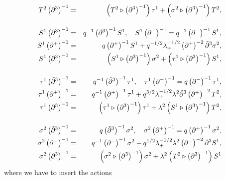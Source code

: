 \documentclass[a4paper,11pt,oneside]{article}
\begin{document}
\begin{eqnarray}
T^{2}\left( \partial ^{3}\right) ^{-1} &=&\left( T^{2}\triangleright \left(
\partial ^{3}\right) ^{-1}\right) \tau ^{1}+\left( \sigma ^{2}\triangleright
\left( \partial ^{3}\right) ^{-1}\right) T^{2},  \nonumber \\[0.16in]
S^{1}\left( \tilde{\partial}^{3}\right) ^{-1} &=&q^{-1}\left( \tilde{\partial%
}^{3}\right) ^{-1}S^{1},\quad S^{1}\left( \partial ^{-}\right)
^{-1}=q^{-1}\left( \partial ^{-}\right) ^{-1}S^{1}, \\
S^{1}\left( \partial ^{+}\right) ^{-1} &=&q\left( \partial ^{+}\right)
^{-1}S^{1}+q^{-1/2}\lambda _{+}^{-1/2}\left( \partial ^{+}\right) ^{-2}%
\tilde{\partial}^{3}\sigma ^{2},  \nonumber \\
S^{1}\left( \partial ^{3}\right) ^{-1} &=&\left( S^{1}\triangleright \left(
\partial ^{3}\right) ^{-1}\right) \sigma ^{2}+\left( \tau ^{1}\triangleright
\left( \partial ^{3}\right) ^{-1}\right) S^{1},  \nonumber \\[0.16in]
\tau ^{1}\left( \tilde{\partial}^{3}\right) ^{-1} &=&q^{-1}\left( \tilde{%
\partial}^{3}\right) ^{-1}\tau ^{1},\quad \tau ^{1}\left( \partial
^{-}\right) ^{-1}=q\left( \partial ^{-}\right) ^{-1}\tau ^{1}, \\
\tau ^{1}\left( \partial ^{+}\right) ^{-1} &=&q^{-1}\left( \partial
^{+}\right) ^{-1}\tau ^{1}+q^{3/2}\lambda _{+}^{-1/2}\lambda ^{2}\tilde{%
\partial}^{3}\left( \partial ^{+}\right) ^{-2}T^{2},  \nonumber \\
\tau ^{1}\left( \partial ^{3}\right) ^{-1} &=&\left( \tau ^{1}\triangleright
\left( \partial ^{3}\right) ^{-1}\right) \tau ^{1}+\lambda ^{2}\left(
S^{1}\triangleright \left( \partial ^{3}\right) ^{-1}\right) T^{2}, 
\nonumber \\[0.16in]
\sigma ^{2}\left( \tilde{\partial}^{3}\right) ^{-1} &=&q\left( \tilde{%
\partial}^{3}\right) ^{-1}\sigma ^{2},\quad \sigma ^{2}\left( \partial
^{+}\right) ^{-1}=q\left( \partial ^{+}\right) ^{-1}\sigma ^{2}, \\
\sigma ^{2}\left( \partial ^{-}\right) ^{-1} &=&q^{-1}\left( \partial
^{-}\right) ^{-1}\sigma ^{2}-q^{1/2}\lambda _{+}^{-1/2}\lambda ^{2}\left(
\partial ^{-}\right) ^{-2}\tilde{\partial}^{3}S^{1},  \nonumber \\
\sigma ^{2}\left( \partial ^{3}\right) ^{-1} &=&\left( \sigma
^{2}\triangleright \left( \partial ^{3}\right) ^{-1}\right) \sigma
^{2}+\lambda ^{2}\left( T^{2}\triangleright \left( \partial ^{3}\right)
^{-1}\right) S^{1}  \nonumber
\end{eqnarray} 
where we have to insert the actions
\end{document}

